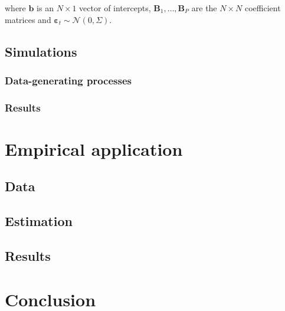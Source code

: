 \documentclass[notitlepage,a4paper,12pt]{article}
\begin{document}
where $\mathbf{b}$ is an $N \times 1$ vector of intercepts, $\mathbf{B}_1, \dots, \mathbf{B}_P$ are the $N \times N$ coefficient matrices and $\boldsymbol{\varepsilon}_t \sim \mathcal{N}(0, \Sigma)$.

\subsection{Simulations}

\subsubsection{Data-generating processes}

\subsubsection{Results}

\section{Empirical application}

\subsection{Data}

\subsection{Estimation}

\subsection{Results}

\section{Conclusion}



\end{document}
